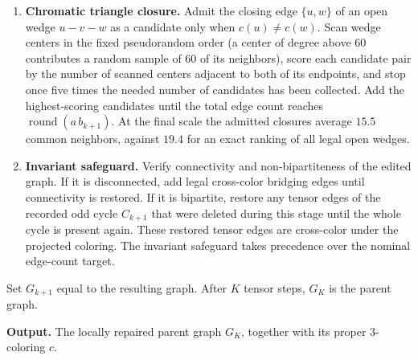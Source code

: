 \documentclass[12pt]{article}
\begin{document}
\begin{tcolorbox}[
breakable, colback=white, colframe=black, boxrule=0.5pt, arc=0pt,
left=6pt, right=6pt, top=6pt, bottom=6pt,
title={Algorithm 1A: Parent construction by local repair}
]
\begin{enumerate}
\item \textbf{Chromatic triangle closure.}
Admit the closing edge \(\{u,w\}\) of an open wedge \(u-v-w\) as a
candidate only when \(c(u)\ne c(w)\).  Scan wedge centers in the fixed
pseudorandom order (a center of degree above \(60\) contributes a random
sample of \(60\) of its neighbors), score each candidate pair by the number
of scanned centers adjacent to both of its endpoints, and stop once five
times the needed number of candidates has been collected.  Add the
highest-scoring candidates until the total edge count reaches
\(\operatorname{round}(a\,b_{k+1})\).  At the final scale the admitted
closures average \(15.5\) common neighbors, against \(19.4\) for an exact
ranking of all legal open wedges.

\item \textbf{Invariant safeguard.}
Verify connectivity and non-bipartiteness of the edited graph.  If it is
disconnected, add legal cross-color bridging edges until connectivity is
restored.  If it is bipartite, restore any tensor edges of the recorded odd
cycle \(C_{k+1}\) that were deleted during this stage until the whole cycle is
present again.  These restored tensor edges are cross-color under the
projected coloring.  The invariant safeguard takes precedence over the
nominal edge-count target.

\end{enumerate}

Set \(G_{k+1}\) equal to the resulting graph.  After \(K\) tensor steps,
\(G_K\) is the parent graph.

\medskip
\textbf{Output.}
The locally repaired parent graph \(G_K\), together with its proper
3-coloring \(c\).

\end{tcolorbox}
\end{document}
